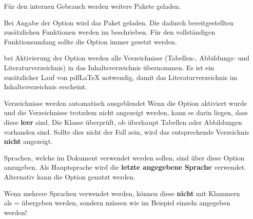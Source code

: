\documentclass[babel=ngerman,highlight=false]{skdoc}
\begin{document}
                \noindent Für den internen Gebrauch werden weitere Pakete geladen.\medskip

                Bei Angabe der Option wird das Paket  geladen. Die dadurch bereitgestellten zusätzlichen Funktionen werden im  beschrieben. Für den vollständigen Funktionsumfang sollte die Option immer gesetzt werden.\medskip

                bei Aktivierung der Option werden alle Verzeichnisse (Tabellen-, Abbildungs- und Literaturverzeichnis) in das Inhaltsverzeichnis übernommen. Es ist ein zusätzlicher Lauf von pdf\LaTeX{} notwendig, damit das Literaturverzeichnis im Inhaltsverzeichnis erscheint.

                \begin{info}{Verzeichnisse werden automatisch ausgeblendet}
                    Wenn die Option  aktiviert wurde und die Verzeichnisse trotzdem nicht angezeigt werden, kann es darin liegen, dass diese \textbf{leer} sind. Die Klasse überprüft, ob überhaupt Tabellen oder Abbildungen vorhanden sind. Sollte dies nicht der Fall sein, wird das entsprechende Verzeichnis \textbf{nicht} angezeigt.
                \end{info}

                \medskip

                Sprachen, welche im Dokument verwendet werden sollen, sind über diese Option anzugeben. Als Hauptsprache wird die \textbf{letzte angegebene Sprache} verwendet. Alternativ kann die Option  genutzt werden.


                \begin{warning}{}
                    Wenn mehrere Sprachen verwendet werden, können diese \textbf{nicht} mit Klammern als  =  übergeben werden, sondern müssen wie im Beispiel einzeln angegeben werden!
                \end{warning}
\end{document}
